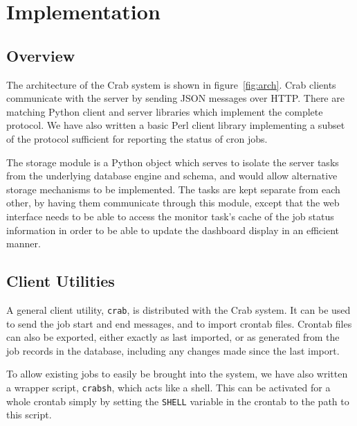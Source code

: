 \section{Implementation}

\subsection{Overview}


The architecture of the Crab system is
shown in figure~\ref{fig:arch}.
Crab clients communicate with the server
by sending JSON messages over HTTP.
There are matching Python client and server libraries
which implement the complete protocol.
We have also written a basic Perl client library implementing
a subset of the protocol sufficient for 
reporting the status of cron jobs.

The storage module is a Python object which serves to isolate the
server tasks from the underlying database engine and schema, and would
allow alternative storage mechanisms to be implemented.
The tasks are kept separate from each other, by having them communicate
through this module, except that the web interface needs to be
able to access the monitor task's cache of the job status information
in order to be able to update the dashboard display in
an efficient manner.

\subsection{Client Utilities}


A general client utility, \texttt{crab},
is distributed with the Crab system.
It can be used to send the job start
and end messages, and to import crontab files.
Crontab files can also be exported,
either exactly as last imported,
or as generated from the job records in the database,
including any changes made since the last
import.

To allow existing jobs to easily
be brought into the system,
we have also written a wrapper script, \texttt{crabsh}, which acts
like a shell.
This can be activated for a whole crontab 
simply by setting the \texttt{SHELL}
variable in the crontab to the path to this script.

